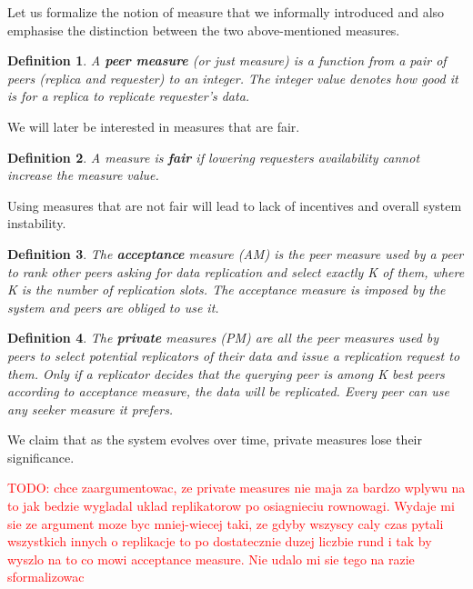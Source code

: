 \documentclass{pracamgren}
\newcounter{collective_ctr} \numberwithin{collective_ctr}{section}
\newtheorem{definition}{Definition}[collective_ctr]
\begin{document}
Let us formalize the notion of measure that we informally introduced and also emphasise the distinction between the two above-mentioned measures.

\begin{definition}
A {\bf peer measure} (or just measure) is a function from a pair of peers (replica and requester) to an integer. The integer value denotes how good it is for a replica to replicate requester's data.
\end{definition}

We will later be interested in measures that are fair.

\begin{definition}
A measure is {\bf fair} if lowering requesters availability cannot increase the measure value.
\end{definition}

Using measures that are not fair will lead to lack of incentives and overall system instability.

\begin{definition}
The {\bf acceptance} measure (AM) is the peer measure used by a peer to rank other peers asking for data replication and select exactly K of them, where K is the number of replication slots. The acceptance measure is imposed by the system and peers are obliged to use it.
\end{definition}

\begin{definition}
The {\bf private} measures (PM) are all the peer measures used by peers to select potential replicators of their data and issue a replication request to them. Only if a replicator decides that the querying peer is among K best peers according to acceptance measure, the data will be replicated. Every peer can use any seeker measure it prefers.\\
\end{definition}

We claim that as the system evolves over time, private measures lose their significance.

\textcolor{red}{TODO: chce zaargumentowac, ze private measures nie maja za bardzo wplywu na to jak bedzie wygladal uklad replikatorow po osiagnieciu rownowagi. Wydaje mi sie ze argument moze byc mniej-wiecej taki, ze gdyby wszyscy caly czas pytali wszystkich innych o replikacje to po dostatecznie duzej liczbie rund i tak by wyszlo na to co mowi acceptance measure. Nie udalo mi sie tego na razie sformalizowac}\\
\end{document}
